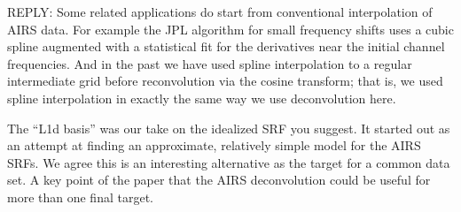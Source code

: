 \documentclass[11pt]{article}
\newcommand {\reply} {\mbox{\small REPLY}}
\begin{document}
\begin{itemize}
  \reply: Some related applications do start from conventional
  interpolation of AIRS data.  For example the JPL algorithm for
  small frequency shifts uses a cubic spline augmented with a
  statistical fit for the derivatives near the initial channel
  frequencies.  And in the past we have used spline interpolation to
  a regular intermediate grid before reconvolution via the cosine
  transform; that is, we used spline interpolation in exactly the
  same way we use deconvolution here.
  
  The ``L1d basis'' was our take on the idealized SRF you suggest.
  It started out as an attempt at finding an approximate, relatively
  simple model for the AIRS SRFs.  We agree this is an interesting
  alternative as the target for a common data set.  A key point of
  the paper that the AIRS deconvolution could be useful for more
  than one final target.


\end{itemize}
\end{document}
